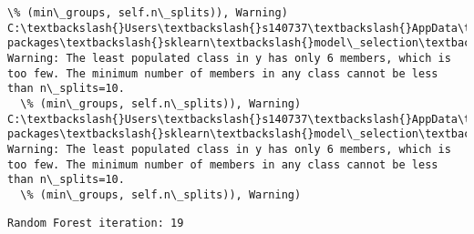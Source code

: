 \documentclass[11pt]{article}
\begin{document}
\begin{Verbatim}[commandchars=\\\{\}]
  \% (min\_groups, self.n\_splits)), Warning)
C:\textbackslash{}Users\textbackslash{}s140737\textbackslash{}AppData\textbackslash{}Local\textbackslash{}Continuum\textbackslash{}anaconda3\textbackslash{}lib\textbackslash{}site-packages\textbackslash{}sklearn\textbackslash{}model\_selection\textbackslash{}\_split.py:605: Warning: The least populated class in y has only 6 members, which is too few. The minimum number of members in any class cannot be less than n\_splits=10.
  \% (min\_groups, self.n\_splits)), Warning)
C:\textbackslash{}Users\textbackslash{}s140737\textbackslash{}AppData\textbackslash{}Local\textbackslash{}Continuum\textbackslash{}anaconda3\textbackslash{}lib\textbackslash{}site-packages\textbackslash{}sklearn\textbackslash{}model\_selection\textbackslash{}\_split.py:605: Warning: The least populated class in y has only 6 members, which is too few. The minimum number of members in any class cannot be less than n\_splits=10.
  \% (min\_groups, self.n\_splits)), Warning)

    \end{Verbatim}

    \begin{Verbatim}[commandchars=\\\{\}]
Random Forest iteration: 19 

    \end{Verbatim}
\end{document}
